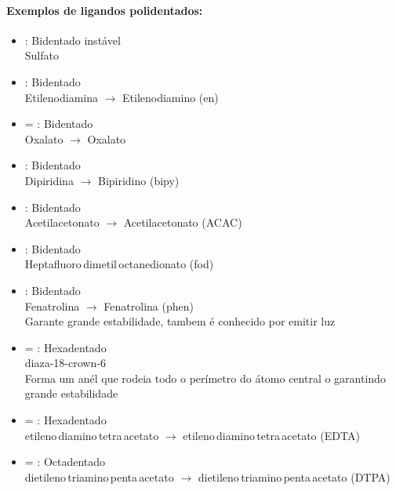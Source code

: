 \documentclass[12pt]{report}
\begin{document}
\paragraph{Exemplos de ligandos polidentados:}

\begin{itemize}

	
	\item {}: Bidentado instável\\
			Sulfato
	
	\item {}: Bidentado\\
			Etilenodiamina $\to$ Etilenodiamino (en)
	
	\item {} = : Bidentado\\
			Oxalato $\to$ Oxalato
	
	\item {}: Bidentado\\
			Dipiridina $\to$ Bipiridino (bipy)

	\item {}: Bidentado\\
			Acetilacetonato $\to$ Acetilacetonato (ACAC)
		
	\item {}: Bidentado\\
			Heptafluoro\,dimetil\,octanedionato (fod)
		
	\item {}: Bidentado\\
			Fenatrolina $\to$ Fenatrolina (phen)\\
			Garante grande estabilidade, tambem é conhecido por 			emitir luz
		
		


	\item {} = :
			Hexadentado\\
			diaza-18-crown-6\\
			Forma um anél que rodeia todo o perímetro do átomo 			central o garantindo grande estabilidade
	
	\item {} = :
			Hexadentado\\
			etileno\,diamino\,tetra\,acetato $\to$
			etileno\,diamino\,tetra\,acetato (EDTA)
	
	
	\item
		 =
		: Octadentado\\
		dietileno\,triamino\,penta\,acetato $\to$
		dietileno\,triamino\,penta\,acetato (DTPA)
		
\end{itemize}
\end{document}
